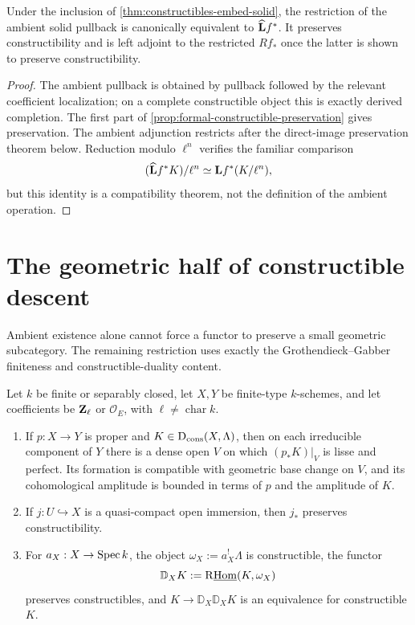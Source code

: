 \begin{proposition}
\label{prop:completed-pullback-adjunction}
Under the inclusion of
\cref{thm:constructibles-embed-solid}, the restriction of the ambient solid
pullback is canonically equivalent to \(\widehat{\mathbf L} f^*\).  It preserves
constructibility and is left adjoint to the restricted \(Rf_*\) once the
latter is shown to preserve constructibility.
\end{proposition}

\begin{proof}
The ambient pullback is obtained by pullback followed by the relevant
coefficient localization; on a complete constructible object this is exactly
derived completion.  The first part of
\cref{prop:formal-constructible-preservation} gives preservation.  The
ambient adjunction restricts after the direct-image preservation theorem
below.  Reduction modulo \(\ell^n\) verifies the familiar comparison
\[
 (\widehat{\mathbf L} f^*K)/\ell^n\simeq
 \mathbf Lf^*(K/\ell^n),
\]
but this identity is a compatibility theorem, not the definition of the
ambient operation.
\end{proof}

\section{The geometric half of constructible descent}

Ambient existence alone cannot force a functor to preserve a small
geometric subcategory.  The remaining restriction uses exactly the
Grothendieck--Gabber finiteness and constructible-duality content.

\begin{theorem}
\label{thm:torsion-finiteness-input}
Let \(k\) be finite or separably closed, let \(X,Y\) be finite-type
\(k\)-schemes, and let coefficients be \(\mathbf Z_\ell\) or \(\mathcal O_E\), with
\(\ell\ne\operatorname{char}k\).
\begin{enumerate}
\item If \(p:X\to Y\) is proper and \(K\in\mathrm D_{\mathrm{cons}}(X,\Lambda)\), then on each
      irreducible component of \(Y\) there is a dense open \(V\) on which
      \((p_*K)|_V\) is lisse and perfect.  Its formation is compatible with
      geometric base change on \(V\), and its cohomological amplitude is
      bounded in terms of \(p\) and the amplitude of \(K\).
\item If \(j:U\hookrightarrow X\) is a quasi-compact open immersion, then
      \(j_*\) preserves constructibility.
\item For \(a_X:X\to\operatorname{Spec} k\), the object
      \(\omega_X:=a_X^!\Lambda\) is constructible, the functor
      \[
       \mathbb D_XK:=
       \mathrm R\underline{\operatorname{Hom}}(K,\omega_X)
      \]
      preserves constructibles, and
      \(K\to\mathbb D_X\mathbb D_XK\) is an equivalence for constructible
      \(K\).
\end{enumerate}
\end{theorem}

